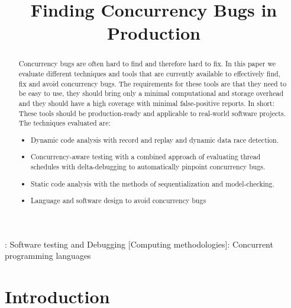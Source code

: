 \documentclass[conference]{IEEEtran}
\begin{document}
\title{Finding Concurrency Bugs in Production}

\author{
}

\maketitle

\begin{abstract}
Concurrency bugs are often hard to find and therefore hard to fix.
In this paper we evaluate different techniques and tools that are currently available to effectively find, fix and avoid concurrency bugs.
The requirements for these tools are that they need to be easy to use, they should bring only a minimal computational and storage overhead and they should have a high coverage with minimal false-positive reports.
In short: These tools should be production-ready and applicable to real-world software projects.
The techniques evaluated are:
\begin{itemize}
    \item Dynamic code analysis with record and replay and dynamic data race detection.
    \item Concurrency-aware testing with a combined approach of evaluating thread schedules with delta-debugging to automatically pinpoint concurrency bugs.
    \item Static code analysis with the methods of sequentialization and model-checking.
    \item Language and software design to avoid concurrency bugs
\end{itemize}
\end{abstract}

\begin{IEEEkeywords}
    : Software testing and Debugging
    [Computing methodologies]: Concurrent programming languages
\end{IEEEkeywords}


\section{Introduction}
\end{document}
